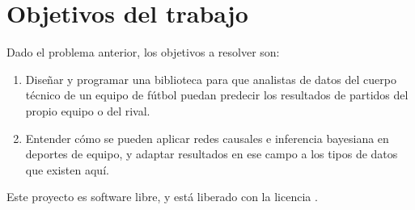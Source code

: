 \section{Objetivos del trabajo} \label{sect:goals}

Dado el problema anterior, los objetivos a resolver son:

\begin{enumerate}
    \item \label{obj:1} Diseñar y programar una biblioteca para que analistas de datos del cuerpo técnico de
    un equipo de fútbol puedan predecir los resultados de partidos del propio equipo o del rival. 
    \item \label{obj:2} Entender cómo se pueden aplicar redes causales e inferencia 
    bayesiana en deportes de equipo, y adaptar resultados en ese campo a 
    los tipos de datos que existen aquí.
\end{enumerate}



Este proyecto es software libre, y está liberado con la licencia \cite{gplv3}.
